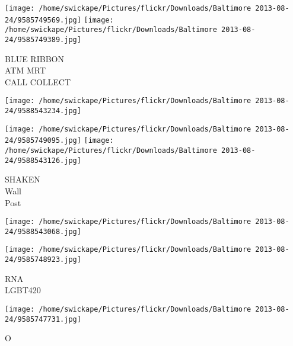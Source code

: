 \documentclass[10pt,letterpaper]{article}
\begin{document}
\vspace{0.25in}
\texttt{[image: /home/swickape/Pictures/flickr/Downloads/Baltimore 2013-08-24/9585749569.jpg]}
\texttt{[image: /home/swickape/Pictures/flickr/Downloads/Baltimore 2013-08-24/9585749389.jpg]}

BLUE RIBBON\\
ATM MRT\\
CALL COLLECT\\
\pagebreak

\texttt{[image: /home/swickape/Pictures/flickr/Downloads/Baltimore 2013-08-24/9588543234.jpg]}

\vspace{0.25in}
\texttt{[image: /home/swickape/Pictures/flickr/Downloads/Baltimore 2013-08-24/9585749095.jpg]}
\texttt{[image: /home/swickape/Pictures/flickr/Downloads/Baltimore 2013-08-24/9588543126.jpg]}

SHAKEN\\
Wall\\
Post\\
\pagebreak

\texttt{[image: /home/swickape/Pictures/flickr/Downloads/Baltimore 2013-08-24/9588543068.jpg]}

\vspace{0.25in}
\texttt{[image: /home/swickape/Pictures/flickr/Downloads/Baltimore 2013-08-24/9585748923.jpg]}

RNA\\
LGBT420\\
\pagebreak

\texttt{[image: /home/swickape/Pictures/flickr/Downloads/Baltimore 2013-08-24/9585747731.jpg]}

O\\
\pagebreak
\end{document}
